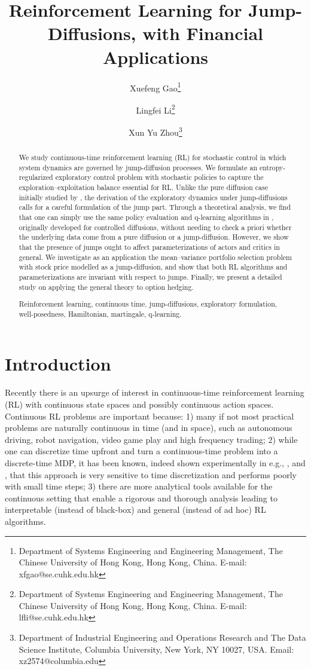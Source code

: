 \documentclass[11pt]{article}
\title{Reinforcement Learning for Jump-Diffusions, with Financial Applications}
\author{
	Xuefeng Gao\thanks{Department of Systems Engineering and Engineering Management, The Chinese University of Hong Kong, Hong Kong, China. E-mail: xfgao@se.cuhk.edu.hk}
	\and
	Lingfei Li\thanks{Department of Systems Engineering and Engineering Management, The Chinese University of Hong Kong, Hong Kong, China. E-mail: lfli@se.cuhk.edu.hk}
	\and
	Xun Yu Zhou\thanks{Department of Industrial Engineering and Operations Research and The Data Science Institute, Columbia University, New York, NY 10027, USA. Email: xz2574@columbia.edu}
}
\newcommand{\1}{\mathbbm{1}}
\begin{document}
\maketitle

\begin{abstract}
We study continuous-time reinforcement learning (RL) for stochastic control in which system dynamics are governed by jump-diffusion processes. We formulate an entropy-regularized exploratory control problem with stochastic policies to capture
the exploration--exploitation balance essential for RL. Unlike the pure diffusion case initially studied by \cite{wang2020reinforcement}, the derivation of the exploratory dynamics under jump-diffusions calls for a careful formulation of the jump part. Through a theoretical analysis, we find that one can simply use the same policy evaluation and q-learning algorithms
in \cite{jia2022policy, jia2022q}, originally developed for controlled diffusions,
without needing to check a priori whether the underlying data come from a pure diffusion
or a jump-diffusion. However, we show that the presence of jumps ought to affect parameterizations of actors and critics in general. We investigate as an application the mean--variance portfolio selection problem with stock price modelled as a jump-diffusion, and show that both RL algorithms and parameterizations are invariant with respect to jumps. Finally, we present a detailed study on applying the general theory to option hedging.

\medskip

 Reinforcement learning, continuous time, jump-diffusions,
exploratory formulation, well-posedness, Hamiltonian, martingale, q-learning.

\end{abstract}


\section{Introduction}

Recently there is an upsurge of interest in continuous-time reinforcement learning (RL) with continuous state spaces and possibly continuous action spaces. Continuous RL problems are important because: 1) many if not most practical problems are naturally continuous in time (and in space), such as autonomous driving, robot navigation,  video game play and high frequency trading; 2) while one can discretize time upfront and turn a continuous-time problem into a discrete-time MDP, it has been known, indeed shown experimentally in e.g., \cite{munos2006policy}, \cite{tallec2019making} and \cite{park2021time},  that this approach is very sensitive to time discretization and performs poorly with small time steps; 3) there are more analytical tools available for the continuous setting that enable a rigorous and thorough analysis leading to interpretable (instead of black-box) and general (instead of ad hoc) RL algorithms.
\end{document}

